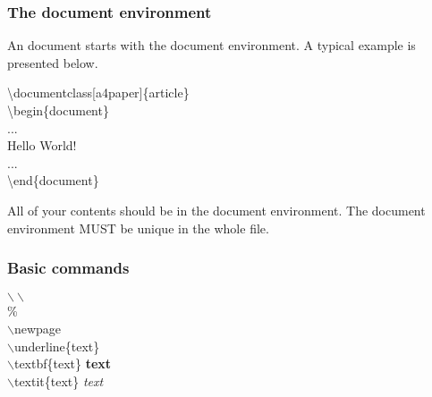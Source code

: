 \documentclass{beamer}
\begin{document}
\begin{frame}
	\frametitle{The document environment}
	\begin{definition}
		An document starts with the {\color{blue}document} environment. A typical example is presented below.
	\end{definition}
	\begin{example}
		{\color{red}\textbackslash documentclass[a4paper]\{article\}}\\
		{\color{red}\textbackslash begin\{document\}}\\
		\qquad...\\
		\qquad Hello World!\\
		\qquad...\\
	{\color{red}\textbackslash end\{document\}}\\
	\end{example}

	All of your contents should be in the document environment. The document environment {\color{blue}MUST} be {\color{blue}unique} in the whole file.
\end{frame}

\begin{frame}
	\frametitle{Basic commands}
   $\backslash \backslash$
   \\\%
   \\$\backslash$newpage
   \\$\backslash$underline\{text\}
   \\$\backslash$textbf\{text\} \qquad \textbf{text}
   \\$\backslash$textit\{text\} \qquad \textit{text}
\end{frame}
\end{document}
